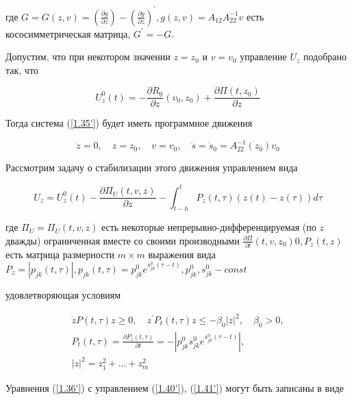 где $G = G(z, v) = (\frac{\partial g}{\partial z}) - (\frac{\partial g}{\partial z})^{'}, g(z, v) = A_{12} A_{22}^{-1} v$ есть кососимметрическая матрица, $G^{'} = -G$.

Допустим, что при некотором значении $z = z_0$ и $v = v_0$ управление $U_z$ подобрано так, что 

\begin{equation} \label{1.38'}
U_z^0 (t) = - \frac{\partial R_0}{\partial z} (v_0, z_0) + \frac{\partial \Pi (t, z_0)}{\partial z}
\end{equation}

Тогда система (\ref{1.35'}) будет иметь программное движения 

\begin{equation} \label{1.39'}
\dot z = 0, \quad z = z_0, \quad v = v_0, \quad \dot s = \dot s_0 = A_{22}^{-1} (z_0) v_0
\end{equation}

Рассмотрим задачу о стабилизации этого движения управлением вида 

\begin{equation} \label{1.40'}
U_z = U_z^0 (t) - \frac{\partial \Pi_U (t, v, z)}{\partial z} - \int_{t - h}^{t} P_z (t, \tau) (z(t) - z(\tau)) d \tau
\end{equation}

где $\Pi_U = \Pi_U (t, v, z)$ есть некоторые непрерывно-дифференцируемая (по $z$ дважды) ограниченная вместе со своими производными $\frac{\partial \Pi}{\partial t} (t, v, z_0) 0 , P_z(t, z)$ есть матрица размерности $m \times m$ выражения вида $P_z = \left| p_{jk} (t, \tau) \right|, p_{jk} (t, \tau) = p_{jk}^0 e^{s_{jk}^0 (\tau - t)}, p_{jk}^0, s_{jk}^0 - const$

удовлетворяющая условиям

\begin{equation} \label{1.41'}
\begin{array}{c}
\dot z P(t, \tau) z \ge 0, \quad z^{'} P_t (t, \tau) z \le - \beta_0 \left| z \right|^2, \quad \beta_0 > 0,\\
P_t (t, \tau) = \frac{\partial P_z (t, \tau)}{\partial t} = - \left| p_{jk}^0 s_{jk}^0 e^{s_{jk}^0 (\tau - t)} \right|,\\
\left| z \right|^2 = z_1^2 + ... + z_m^2
\end{array}
\end{equation}

Уравнения (\ref{1.36'}) с управлением (\ref{1.40'}), (\ref{1.41'}) могут быть записаны в виде

